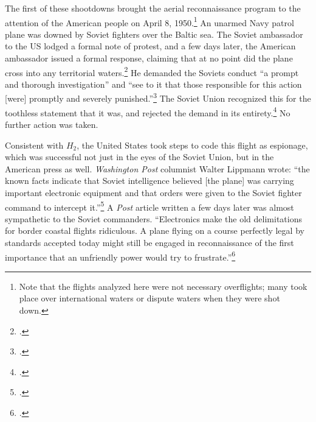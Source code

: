 \documentclass[12pt]{extarticle}
\begin{document}

The first of these shootdowns brought the aerial reconnaissance program to the attention of the American people on April 8, 1950.\footnote{Note that the flights analyzed here were not necessary overflights; many took place over international waters or dispute waters when they were shot down.} An unarmed Navy patrol plane was downed by Soviet fighters over the Baltic sea. The Soviet ambassador to the US lodged a formal note of protest, and a few days later, the American ambassador issued a formal response, claiming that at no point did the plane cross into any territorial waters.\footcite{kirk_ambassador_1950} He demanded the Soviets conduct \enquote{a prompt and thorough investigation} and \enquote{see to it that those responsible for this action [were] promptly and severely punished.}\footcite{the_associated_press_text_1950} The Soviet Union recognized this for the toothless statement that it was, and rejected the demand in its entirety.\footcite{salisbury_kremlin_1950} No further action was taken.

Consistent with $H_2$, the United States took steps to code this flight as espionage, which was successful not just in the eyes of the Soviet Union, but in the American press as well. \emph{Washington Post} columnist Walter Lippmann wrote: \enquote{the known facts indicate that Soviet intelligence \textelp{} believed [the plane] was carrying important electronic equipment and that orders were given to the Soviet fighter command to intercept it.}\footcite{lippmann_baltic_1950} A \emph{Post} article written a few days later was almost sympathetic to the Soviet commanders. \enquote{Electronics make the old delimitations for border coastal flights ridiculous. A plane flying on a course perfectly legal by standards accepted today might still be engaged in reconnaissance of the first importance that an unfriendly power would try to frustrate.}\footcite{childs_baltic_1950}

\end{document}

